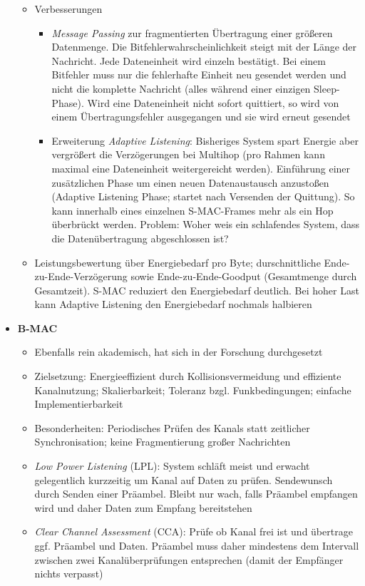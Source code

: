 \begin{itemize}
\begin{itemize}
		\item Verbesserungen
		\begin{itemize}
			\item \textit{Message Passing} zur fragmentierten Übertragung einer größeren Datenmenge. Die Bitfehlerwahrscheinlichkeit steigt mit der Länge der Nachricht. Jede Dateneinheit wird einzeln bestätigt. Bei einem Bitfehler muss nur die fehlerhafte Einheit neu gesendet werden und nicht die komplette Nachricht (alles während einer einzigen Sleep-Phase). Wird eine Dateneinheit nicht sofort quittiert, so wird von einem Übertragungsfehler ausgegangen und sie wird erneut gesendet
			\item Erweiterung \textit{Adaptive Listening}: Bisheriges System spart Energie aber vergrößert die Verzögerungen bei Multihop (pro Rahmen kann maximal eine Dateneinheit weitergereicht werden). Einführung einer zusätzlichen Phase um einen neuen Datenaustausch anzustoßen (Adaptive Listening Phase; startet nach Versenden der Quittung). So kann innerhalb eines einzelnen S-MAC-Frames mehr als ein Hop überbrückt werden. Problem: Woher weis ein schlafendes System, dass die Datenübertragung abgeschlossen ist?
		\end{itemize}
		\item Leistungsbewertung über Energiebedarf pro Byte; durschnittliche Ende-zu-Ende-Verzögerung sowie Ende-zu-Ende-Goodput (Gesamtmenge durch Gesamtzeit). S-MAC reduziert den Energiebedarf deutlich. Bei hoher Last kann Adaptive Listening den Energiebedarf nochmals halbieren
	\end{itemize}
	\item \textbf{B-MAC}
	\begin{itemize}
		\item Ebenfalls rein akademisch, hat sich in der Forschung durchgesetzt
		\item Zielsetzung: Energieeffizient durch Kollisionsvermeidung und effiziente Kanalnutzung; Skalierbarkeit; Toleranz bzgl. Funkbedingungen; einfache Implementierbarkeit
		\item Besonderheiten: Periodisches Prüfen des Kanals statt zeitlicher Synchronisation; keine Fragmentierung großer Nachrichten
		\item \textit{Low Power Listening} (LPL): System schläft meist und erwacht gelegentlich kurzzeitig um Kanal auf Daten zu prüfen. Sendewunsch durch Senden einer Präambel. Bleibt nur wach, falls Präambel empfangen wird und daher Daten zum Empfang bereitstehen
		\item \textit{Clear Channel Assessment} (CCA): Prüfe ob Kanal frei ist und übertrage ggf. Präambel und Daten. Präambel muss daher mindestens dem Intervall zwischen zwei Kanalüberprüfungen entsprechen (damit der Empfänger nichts verpasst)

\end{itemize}
\end{itemize}
